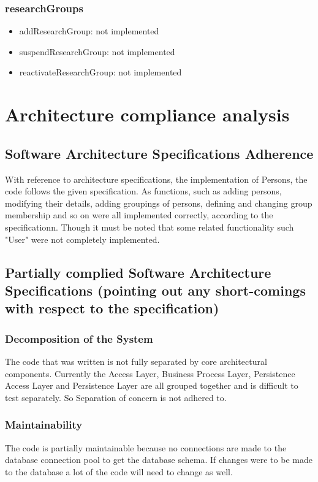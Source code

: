 \documentclass{article}
\begin{document}
		\subsubsection{researchGroups}
			\begin{itemize}
			\item addResearchGroup: not implemented
			\item suspendResearchGroup: not implemented
			\item reactivateResearchGroup: not implemented
			\end{itemize}

   \newpage

\section{Architecture compliance analysis}
     \subsection{Software Architecture Specifications Adherence}
	With reference to architecture specifications, the implementation of Persons, the code follows the given specification. As functions, such as adding persons, modifying their details, adding groupings of persons, defining and changing group membership and so on were all implemented correctly, according to the specificationn. Though it must be noted that some related functionality such "User" were not completely implemented.

     \subsection{Partially complied Software Architecture Specifications (pointing out any short-comings with respect to the specification)}

     \subsubsection{Decomposition of the System}
     The code that was written is not fully separated by core architectural components. Currently the Access Layer, Business Process Layer, Persistence Access Layer and Persistence Layer are all grouped together and is difficult to test separately. So Separation of concern is not adhered to.
     
     \subsubsection{Maintainability}
     The code is partially maintainable because no connections are made to the database connection pool to get the database schema. If changes were to be made to the database a lot of the code will need to change as well.
\end{document}
